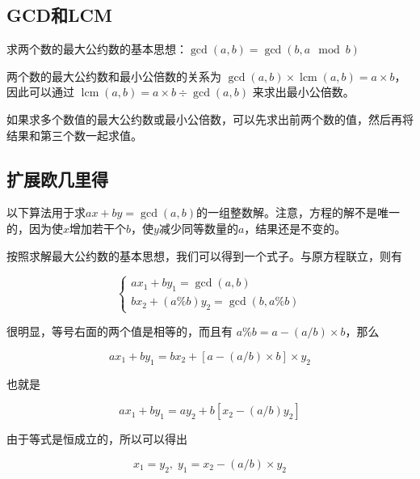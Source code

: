 \subsection{GCD和LCM}

求两个数的最大公约数的基本思想：$\gcd(a,b)=\gcd(b,a\mod b)$

两个数的最大公约数和最小公倍数的关系为 $\gcd(a,b) \times \operatorname{lcm}(a,b)=a \times b$，因此可以通过 $\operatorname{lcm}(a,b) = a \times b \div \gcd(a,b)$ 来求出最小公倍数。

如果求多个数值的最大公约数或最小公倍数，可以先求出前两个数的值，然后再将结果和第三个数一起求值。



\subsection{扩展欧几里得}

以下算法用于求$ax+by=\gcd(a,b)$的一组整数解。注意，方程的解不是唯一的，因为使$x$增加若干个$b$，使$y$减少同等数量的$a$，结果还是不变的。

按照求解最大公约数的基本思想，我们可以得到一个式子。与原方程联立，则有

\begin{equation}
  \left\{
    \begin{array}{l}
      ax_{1}+by_{1}=\gcd(a,b) \\
      bx_{2}+(a\%b)y_{2}=\gcd(b,a\%b)
    \end{array}
  \right.
\end{equation}

很明显，等号右面的两个值是相等的，而且有 $a\%b=a-(a/b) \times b$，那么

\begin{equation}
  ax_{1}+by_{1}=bx_{2}+[a-(a/b) \times b] \times y_{2}
\end{equation}

也就是

\begin{equation}
  ax_{1}+by_{1}=ay_{2}+b[x_{2}-(a/b)y_{2}]
\end{equation}

由于等式是恒成立的，所以可以得出

\begin{equation}
  x_{1}=y_{2},\; y_{1}=x_{2}-(a/b) \times y_{2}
\end{equation}



